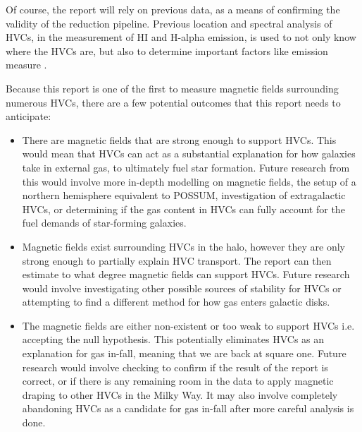 Of course, the report will rely on previous data, as a means of confirming the validity of the reduction pipeline. Previous location and spectral analysis of HVCs, in the measurement of HI and H-alpha emission, is used to not only know where the HVCs are, but also to determine important factors like emission measure \cite{ID5, ID26, ID30}.

Because this report is one of the first to measure magnetic fields surrounding numerous HVCs, there are a few potential outcomes that this report needs to anticipate:
\begin{itemize}
\item There are magnetic fields that are strong enough to support HVCs. This would mean that HVCs can act as a substantial explanation for how galaxies take in external gas, to ultimately fuel star formation. Future research from this would involve more in-depth modelling on magnetic fields, the setup of a northern hemisphere equivalent to POSSUM, investigation of extragalactic HVCs, or determining if the gas content in HVCs can fully account for the fuel demands of star-forming galaxies.
\item Magnetic fields exist surrounding HVCs in the halo, however they are only strong enough to partially explain HVC transport. The report can then estimate to what degree magnetic fields can support HVCs. Future research would involve investigating other possible sources of stability for HVCs or attempting to find a different method for how gas enters galactic disks.
\item The magnetic fields are either non-existent or too weak to support HVCs i.e. accepting the null hypothesis. This potentially eliminates HVCs as an explanation for gas in-fall, meaning that we are back at square one. Future research would involve checking to confirm if the result of the report is correct, or if there is any remaining room in the data to apply magnetic draping to other HVCs in the Milky Way. It may also involve completely abandoning HVCs as a candidate for gas in-fall after more careful analysis is done.
\end{itemize}